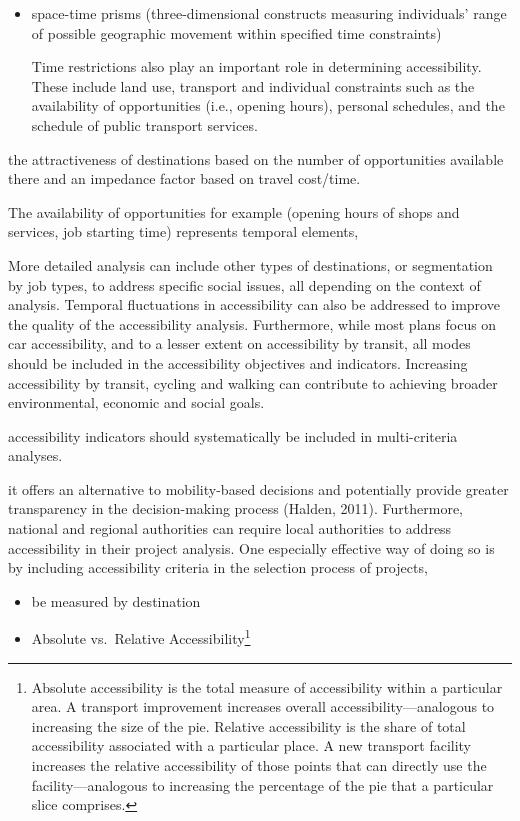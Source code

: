\documentclass[12pt,]{article}
\let\rmarkdownfootnote\footnote%
\def\footnote{\protect\rmarkdownfootnote}
\begin{document}
\begin{itemize}
\item
  space-time prisms (three-dimensional constructs measuring individuals'
  range of possible geographic movement within specified time
  constraints)

  Time restrictions also play an important role in determining
  accessibility. These include land use, transport and individual
  constraints such as the availability of opportunities (i.e., opening
  hours), personal schedules, and the schedule of public transport
  services.
\end{itemize}

the attractiveness of destinations based on the number of opportunities
available there and an impedance factor based on travel cost/time.

The availability of opportunities for example (opening hours of shops
and services, job starting time) represents temporal elements,

More detailed analysis can include other types of destinations, or
segmentation by job types, to address specific social issues, all
depending on the context of analysis. Temporal fluctuations in
accessibility can also be addressed to improve the quality of the
accessibility analysis. Furthermore, while most plans focus on car
accessibility, and to a lesser extent on accessibility by transit, all
modes should be included in the accessibility objectives and indicators.
Increasing accessibility by transit, cycling and walking can contribute
to achieving broader environmental, economic and social goals.

accessibility indicators should systematically be included in
multi-criteria analyses.

it offers an alternative to mobility-based decisions and potentially
provide greater transparency in the decision-making process (Halden,
2011). Furthermore, national and regional authorities can require local
authorities to address accessibility in their project analysis. One
especially effective way of doing so is by including accessibility
criteria in the selection process of projects,

\begin{itemize}
\item
  be measured by destination
\item
  Absolute vs.~Relative Accessibility\footnote{Absolute accessibility is
    the total measure of accessibility within a particular area. A
    transport improvement increases overall accessibility---analogous to
    increasing the size of the pie. Relative accessibility is the share
    of total accessibility associated with a particular place. A new
    transport facility increases the relative accessibility of those
    points that can directly use the facility---analogous to increasing
    the percentage of the pie that a particular slice comprises.}
\end{itemize}
\end{document}
